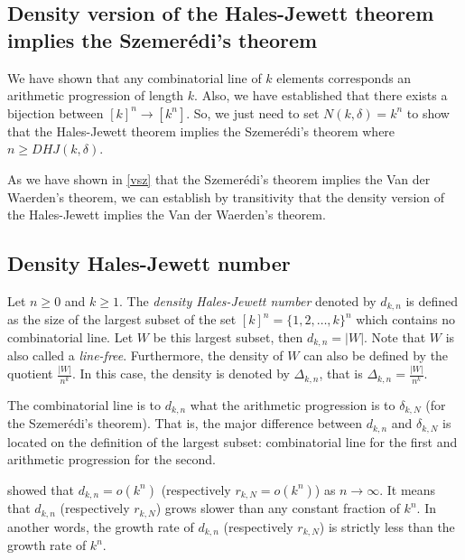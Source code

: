\subsection{Density version of the Hales-Jewett theorem implies the  Szemerédi's theorem}

We have shown that any combinatorial line of $k$ elements corresponds an arithmetic progression of length $k.$ Also, we have established that there exists a bijection between $[k]^n \longrightarrow [k^n].$ So, we just need to set $N(k,\delta)=k^n$ to show that the Hales-Jewett theorem implies the Szemerédi's theorem where $n\geq DHJ(k,\delta).$

As we have shown in \eqref{vsz} that the Szemerédi's theorem implies the  Van der Waerden's theorem, we can establish by transitivity that the density version of the Hales-Jewett implies the Van der Waerden's theorem.

\subsection{Density Hales-Jewett number} \label{dhjn}

Let $n \geq 0$ and $k \geq 1.$ The \textit{density Hales-Jewett number}	denoted by $d_{k,n}$ is defined as the size of the largest subset of the set $[k]^n=\{1,2, \ldots, k\}^n$ which contains no combinatorial	line.  Let $W$ be this largest subset, then $d_{k,n}=|W|.$  Note that $W$ is also called a \textit{line-free}. Furthermore, the density of $W$ can also be defined by the quotient $\frac{|W|}{n^k}$. In this case, the density is denoted by $\Delta_{k,n}$, that is  $\Delta_{k,n}=\frac{|W|}{n^k}.$ 

The combinatorial line is to $d_{k,n}$ what the arithmetic progression is to $\delta_{k,N}$ (for the Szemerédi's theorem). That is, the major  difference between $d_{k,n}$ and $\delta_{k,N}$ is located on the definition of the largest subset: combinatorial line for the first and arithmetic progression for the second. 

\cite*{furstenberg1991density} showed that $d_{k,n}=o(k^n)$ (respectively $r_{k,N}=o(k^n)$) as $n\longrightarrow \infty.$
It means that $d_{k,n}$ (respectively $r_{k,N}$) grows slower than  any constant fraction of $k^n$.
In another words, the growth rate of $d_{k,n}$ (respectively $r_{k,N}$) is strictly less
than the growth rate of $k^n.$

